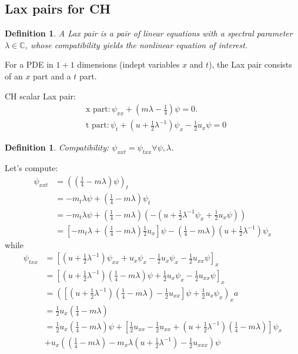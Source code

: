 \documentclass[12pt,reqno]{amsart}
\numberwithin{equation}{section}  %
\newcommand{\cc}{\mathbb{C}}
\newtheorem{definition}[theorem]{Definition}
\begin{document}
\subsection{Lax pairs for CH} 
\label{ssec:lax-pair-CH}
\begin{definition}
A Lax pair is a pair of linear equations with a spectral parameter $\lambda \in
\cc$, whose compatibility yields the nonlinear equation of interest. 
\end{definition}
For a PDE in $1+1$ dimensions (indept variables $x$ and $t$), the Lax pair
consists of an $x$ part and a $t$ part.

CH scalar Lax pair:
%
%
\begin{equation*}
\begin{split}
  & \text{x part}: \psi_{xx} + (m \lambda - \frac{1}{4}) \psi = 0.
  \\
  & \text{t part}: \psi_{t} + (u + \frac{1}{2} \lambda^{-1})\psi_{x} -
  \frac{1}{2}u_{x} \psi = 0
\end{split}
\end{equation*}
%
%
\begin{definition}
  Compatibility: $\psi_{xxt} = \psi_{txx} \forall \psi, \lambda$. 
\end{definition}
Let's compute:
%
%
\begin{equation*}
\begin{split}
  \psi_{xxt}
  & = \left( (\frac{1}{4} - m \lambda)\psi \right)_{t}
  \\
  & = -m_{t} \lambda \psi + \left( \frac{1}{4} - m \lambda \right)
  \psi_{t}
  \\
  & = -m_{t} \lambda \psi + \left( \frac{1}{4} - m \lambda \right)\left(
  -(u + \frac{1}{2} \lambda^{-1}\psi_{x} + \frac{1}{2} u_{x} \psi)
  \right)
  \\
  & = \left[ -m_{t} \lambda + (\frac{1}{4}- m \lambda)\frac{1}{2}u_{x} \right]\psi
  - (\frac{1}{4} - m \lambda)(u + \frac{1}{2}\lambda^{-1})\psi_{x}
\end{split}
\end{equation*}
%
%
while
%
%
\begin{equation*}
\begin{split}
  \psi_{txx}
  & = \left[ (u + \frac{1}{2} \lambda^{-1})\psi_{xx} + u_{x}
  \psi_{x} - \frac{1}{2} u_{x} \psi_{x} - \frac{1}{2} u_{xx} \psi
  \right]_{x}
  \\
  & = \left[ (u + \frac{1}{2}\lambda^{-1})(\frac{1}{4} - m \lambda)\psi
  + \frac{1}{2} u_{x} \psi_{x} - \frac{1}{2} u_{xx} \psi \right]_{x}
  \\
  & = \left( \left[ (u + \frac{1}{2} \lambda^{-1})(\frac{1}{4} - m \lambda) -
  \frac{1}{2} u_{xx} \right]\psi + \frac{1}{2} u_{x} \psi_{x} \right)_{x}a
  \\
  & = \frac{1}{2} u_{x}(\frac{1}{4} - m \lambda)
  \\
  & = \frac{1}{2}u_{x}\left( \frac{1}{4} - m \lambda \right)\psi + \left[
  \frac{1}{2}u_{xx} - \frac{1}{2} u_{xx} + (u +
  \frac{1}{2}\lambda^{-1})(\frac{1}{4} - m \lambda)
  \right]\psi_{x}
  \\
  & + u_{x}\left( (\frac{1}{4} - m \lambda) - m_{x} \lambda (u +
    \frac{1}{2} \lambda^{-1}) - \frac{1}{2} u_{xxx}\right)\psi
\end{split}
\end{equation*}
\end{document}
